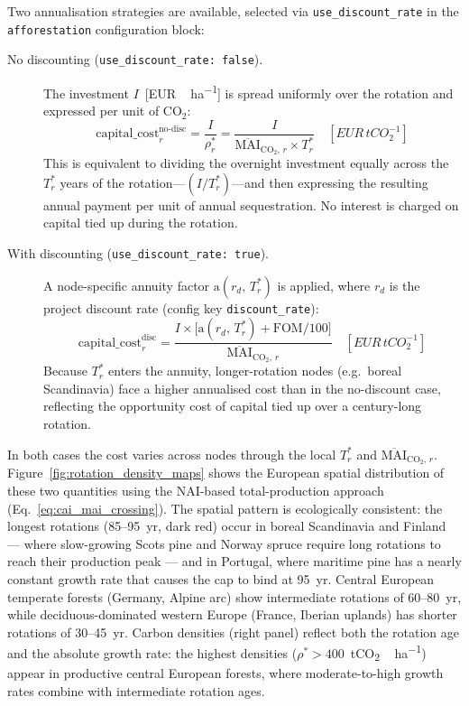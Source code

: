 \documentclass[12pt, a4paper]{article}
\begin{document}
Two annualisation strategies are available, selected via \texttt{use\_discount\_rate} in the \texttt{afforestation} configuration block:

\begin{description}
  \item[No discounting (\texttt{use\_discount\_rate: false}).]
  The investment $I$~[\si{EUR\,ha^{-1}}] is spread uniformly over the rotation
  and expressed per unit of CO$_2$:
  \[
    \mathrm{capital\_cost}^{\mathrm{no\text{-}disc}}_r
    = \frac{I}{\rho^*_r}
    = \frac{I}{\overline{\mathrm{MAI}}_{\mathrm{CO}_2,\,r} \times T^*_r}
    \quad [\si{EUR\,tCO_2^{-1}}]
  \]
  This is equivalent to dividing the overnight investment equally across the $T^*_r$ years of the rotation---$(I/T^*_r)$---and then expressing the resulting annual payment per unit of annual sequestration.  No interest is charged on capital tied up during the rotation.

  \item[With discounting (\texttt{use\_discount\_rate: true}).]
  A node-specific annuity factor $\mathrm{a}(r_d,\,T^*_r)$ is applied, where $r_d$ is the project discount rate (config key \texttt{discount\_rate}):
  \[
    \mathrm{capital\_cost}^{\mathrm{disc}}_r
    = \frac{I \times \bigl[\mathrm{a}(r_d,\,T^*_r) + \mathrm{FOM}/100\bigr]}
           {\overline{\mathrm{MAI}}_{\mathrm{CO}_2,\,r}}
    \quad [\si{EUR\,tCO_2^{-1}}]
  \]
  Because $T^*_r$ enters the annuity, longer-rotation nodes (e.g.\ boreal Scandinavia) face a higher annualised cost than in the no-discount case, reflecting the opportunity cost of capital tied up over a century-long rotation.
\end{description}

In both cases the cost varies across nodes through the local $T^*_r$ and $\overline{\mathrm{MAI}}_{\mathrm{CO}_2,\,r}$.  Figure~\ref{fig:rotation_density_maps} shows the European spatial distribution of these two quantities using the NAI-based total-production approach (Eq.~\ref{eq:cai_mai_crossing}).  The spatial pattern is ecologically consistent: the longest rotations (85--95~yr, dark red) occur in boreal Scandinavia and Finland --- where slow-growing Scots pine and Norway spruce require long rotations to reach their production peak --- and in Portugal, where maritime pine has a nearly constant growth rate that causes the cap to bind at \SI{95}{yr}.  Central European temperate forests (Germany, Alpine arc) show intermediate rotations of 60--80~yr, while deciduous-dominated western Europe (France, Iberian uplands) has shorter rotations of 30--45~yr.  Carbon densities (right panel) reflect both the rotation age and the absolute growth rate: the highest densities ($\rho^*>400$~\si{tCO_2\,ha^{-1}}) appear in productive central European forests, where moderate-to-high growth rates combine with intermediate rotation ages.
\end{document}
